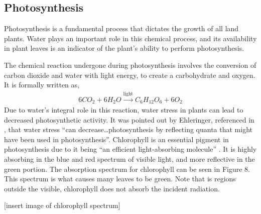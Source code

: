 \subsection{Photosynthesis}

Photosynthesis is a fundamental process that dictates the growth of all land plants.  Water plays an important role in this chemical process, and its availability in plant leaves is an indicator of the plant's ability to perform photosynthesis.

The chemical reaction undergone during photosynthesis involves the conversion of carbon dioxide and water with light energy, to create a carbohydrate and oxygen.  It is formally written as,
%
\begin{align}
    6CO_2 + 6H_2O \xrightarrow{\text{light}} C_6H_12O_6 + 6O_2
\end{align}
%
Due to water's integral role in this reaction, water stress in plants can lead to decreased photosynthetic activity.  It was pointed out by Ehleringer, referenced in \cite{akinci}, that water stress “can decrease…photosynthesis by reflecting quanta that might have been used in photosynthesis”.   Chlorophyll is an essential pigment in photosynthesis due to it being “an efficient light-absorbing molecule” \cite{ecophysiology}.  It is highly absorbing in the blue and red spectrum of visible light, and more reflective in the green portion.  The absorption spectrum for chlorophyll can be seen in Figure 8. This spectrum is what causes many leaves to be green.  Note that is regions outside the visible, chlorophyll does not absorb the incident radiation.

[insert image of chlorophyll spectrum]
